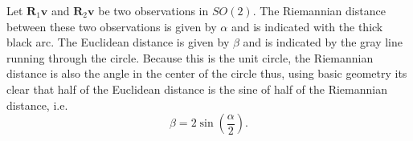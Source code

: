 \begin{center}
\end{center}

Let $\bm R_1\bm v$ and $\bm R_2\bm v$ be two observations in $SO(2)$.  The Riemannian distance between these two observations is given by $\alpha$ and is indicated with the thick black arc.  The Euclidean distance is given by $\beta$ and is indicated by the gray line running through the circle.  Because this is the unit circle, the Riemannian distance is also the angle in the center of the circle thus, using basic geometry its clear that half of the Euclidean distance is the sine of half of the Riemannian distance, i.e.
\[
\beta=2\sin\left(\frac{\alpha}{2}\right).
\]

